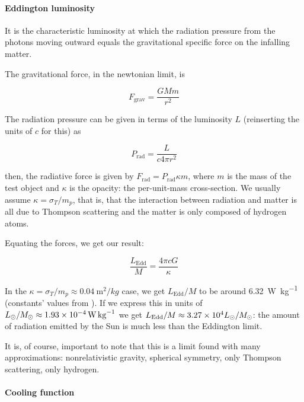 \documentclass[main.tex]{subfiles}
\begin{document}
\paragraph{Eddington luminosity}

It is the characteristic luminosity at which the radiation pressure from the photons moving outward equals the gravitational specific force on the infalling matter.

The gravitational force, in the newtonian  limit, is

\begin{equation}
  F_{\text{grav}} = \frac{GMm}{r^2 }
\end{equation}

The radiation pressure can be given in terms of the luminosity \(L\) (reinserting the units of \(c\) for this) as

\begin{equation}
  P_{\text{rad}} = \frac{L}{c 4 \pi r^2}
\end{equation}

then, the radiative force is given by \(F_{\text{rad}} =  P_{\text{rad}} \kappa m\), where \(m\) is the mass of the test object and \(\kappa\) is the opacity: the per-unit-mass cross-section. We usually assume \(\kappa = \sigma_T/m_p\), that is, that the interaction between radiation and matter is all due to Thompson scattering and the matter is only composed of hydrogen atoms.

Equating the forces, we get our result:

\begin{equation}
 \frac{L_{\text{Edd}}}{M} = \frac{4 \pi c G}{\kappa}
\end{equation}

In the \(\kappa = \sigma_T / m_p \approx \SI{0.04}{\metre^2 / kg}\) case, we get \(L_{\text{Edd}} / M\) to be around \SI{6.32}{\watt\per\kilo\gram} (constants' values from \cite[]{NISTReccomendedConstants:2018}).
If we express this in units of \(L_{\odot} / M_{\odot} \approx \SI{1.93E-04}{\watt\per\kilo\gram}\) \cite[]{SunFactSheet:2018} we get \(L_{\text{Edd}} / M \approx  \num{3.27E+04} L_{\odot} / M_{\odot}\):
the amount of radiation emitted by the Sun is much less than the Eddington limit.

It is, of course, important to note that this is a limit found with many approximations: nonrelativistic gravity, spherical symmetry, only Thompson scattering, only hydrogen.

\paragraph{Cooling function}
\end{document}
